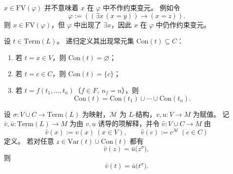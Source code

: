 \documentclass[lang=cn,a4paper,newtx,section]{elegantbook}
\begin{document}
 \begin{remark}
 $x\in\mathrm{FV}(\varphi)$ 并不意味着 $x$ 在 $\varphi$ 中不作约束变元。
 例如令
 \[
   \varphi:=((\exists x\,(x=y))\to(x=z)).
 \]
 则 $x\in\mathrm{FV}(\varphi)$，但 $\varphi$ 中出现了 $\exists x$，因此 $x$ 在 $\varphi$ 中仍作约束变元。
 \end{remark}

 \begin{definition}[项中出现的常元]
 \label{consts-in-term}
 设 $t\in\mathrm{Term}(L)$。
 递归定义其出现常元集 $\mathrm{Con}(t)\subseteq C$：
 \begin{enumerate}
   \item 若 $t=x\in V$，则 $\mathrm{Con}(t)=\varnothing$；
   \item 若 $t=c\in C$，则 $\mathrm{Con}(t)=\{c\}$；
   \item 若 $t=f(t_1,\dots,t_n)$（$f\in F,\ n_f=n$），则
   \[
     \mathrm{Con}(t)=\mathrm{Con}(t_1)\cup\cdots\cup\mathrm{Con}(t_n).
   \]
 \end{enumerate}
 \end{definition}

 \begin{lemma}[项的替换]
 \label{term-substitution}
 设 $\sigma:V\cup C\to\mathrm{Term}(L)$ 为映射，$\mathcal M$ 为 $L$-结构，$v,u:V\to M$ 为赋值。
 记 $\bar v,\bar u:\mathrm{Term}(L)\to M$ 为由 $v,u$ 诱导的项解释，并令 $\hat v:V\cup C\to M$ 由
 \[
   \hat v(x):=v(x)\ (x\in V),\qquad \hat v(c):=c^{\mathcal M}\ (c\in C)
 \]
 定义。
 若对任意 $z\in\mathrm{Var}(t)\cup\mathrm{Con}(t)$ 都有
 \[
   \hat v(z)=\bar u\bigl(z^{\sigma}\bigr),
 \]
 则
 \[
   \bar v(t)=\bar u\bigl(t^{\sigma}\bigr).
 \]
 \end{lemma}
\end{document}
